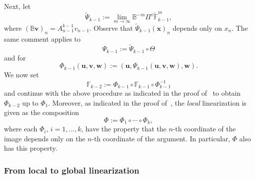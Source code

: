 \documentclass[reqno, a4paper, 10pt]{amsart}
\theoremstyle{plain}
\numberwithin{equation}{section}
\theoremstyle{remark}
\begin{document}
Next, let
\[
\tilde{\Psi}_{k-1}:=\lim_{m\to \infty}\mathbb B^{-m}\Pi^v\tilde{\mathbb F}_{k-1}^m,
\]
where
$
(\mathbb B\mathbf v)_n=A_{n-1}^{k-1}v_{n-1}.
$
Observe that $\tilde{\Psi}_{k-1}(\mathbf x)_n$ depends only on $x_n$. The same comment applies to
\[
\Psi_{k-1}:=\tilde{\Psi}_{k-1}\circ \Theta
\]
and for
\[
\Phi_{k-1}(\mathbf u, \mathbf v, \mathbf w):=(\mathbf u, \Psi_{k-1}(\mathbf u, \mathbf v, \mathbf w), \mathbf w).
\]
We now set 
\[
\mathbb F_{k-2}:=\Phi_{k-1}\circ \mathbb F_{k-1}\circ \Phi_{k-1}^{-1}
\]
and continue with the above procedure as indicated in the proof of~\cite[Lemma 5]{ZZJ} to obtain $\Phi_{k-2}$ up to $\Phi_1$. Moreover, as indicated in the proof of~\cite[Lemma 10]{ZZJ}, the \emph{local} linearization  is given as the composition 
\[
\Phi:=\Phi_1\circ\cdots\circ\Phi_k,
\]
where each $\Phi_i$, $i=1,...,k$, have the property that  the $n$-th coordinate of the image depends only on the $n$-th coordinate of the argument. In particular, $\Phi$ also has this property.




\subsubsection{From local to global linearization}\label{sec: global linearization}
\end{document}
